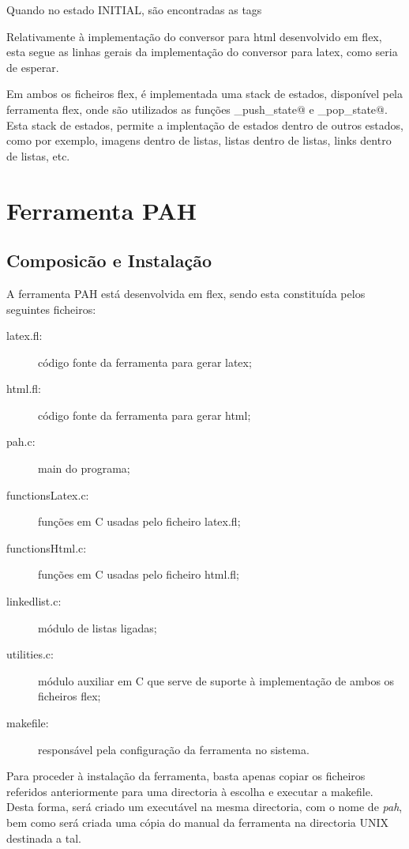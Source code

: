 \documentclass[11pt,a4paper]{article}
\begin{document}
Quando no estado INITIAL, são encontradas as tags \verb@ %%table% @ e \verb@ %%latex% @, são iniciados os estados TABLE e LATEX, correspondendo à inserção de tabelas e à inserção de comandos nativos LaTeX, respectivamente.

Relativamente à implementação do conversor para html desenvolvido em flex, esta segue as linhas gerais da implementação do conversor para latex, como seria de esperar.

Em ambos os ficheiros flex, é implementada uma stack de estados, disponível pela ferramenta flex, onde são utilizados as funções \verb@yy_push_state@ e \verb@yy_pop_state@. Esta stack de estados, permite a implentação de estados dentro de outros estados, como por exemplo, imagens dentro de listas, listas dentro de listas, links dentro de listas, etc.


 \newpage 

\section{Ferramenta PAH}

\subsection{Composicão e Instalação}
A ferramenta PAH está desenvolvida em flex, sendo esta constituída pelos seguintes ficheiros: \\  

\begin{description}
    \item[latex.fl:] código fonte da ferramenta para gerar latex;
    \item[html.fl:] código fonte da ferramenta para gerar html;
    \item[pah.c:] main do programa;
    \item[functionsLatex.c:] funções em C usadas pelo ficheiro latex.fl;
    \item[functionsHtml.c:] funções em C usadas pelo ficheiro html.fl;
    \item[linkedlist.c:] módulo de listas ligadas;
    \item[utilities.c:] módulo auxiliar em C que serve de suporte à implementação de ambos os ficheiros flex;
    \item[makefile:] responsável pela configuração da ferramenta no sistema.
\end{description}
 

Para proceder à instalação da ferramenta, basta apenas copiar os ficheiros referidos anteriormente para uma directoria à escolha e executar a makefile. Desta forma, será criado um executável na mesma directoria, com o nome de \textit{pah}, bem como será criada uma cópia do manual da ferramenta na directoria UNIX destinada a tal. \\   \\ 
\end{document}
